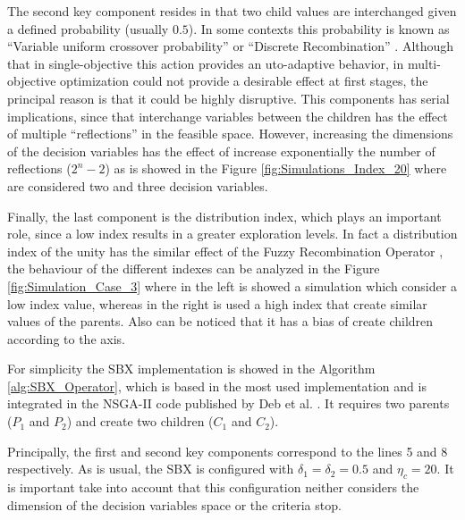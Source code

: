 The second key component resides in that two child values are interchanged given a defined probability (usually $0.5$).
%
In some contexts this probability is known as ``Variable uniform crossover probability'' \cite{tuvsar2007differential} or ``Discrete Recombination'' \cite{muhlenbein1993predictive}.
%
Although that in single-objective this action provides an uto-adaptive behavior, in multi-objective optimization could not provide a desirable effect at first stages, the principal reason is that it could be highly disruptive.
%
This components has serial implications, since that interchange variables between the children has the effect of multiple ``reflections'' in the feasible space.
%
However, increasing the dimensions of the decision variables has the effect of increase exponentially the number of reflections ($2^{n}-2$) as is showed in the Figure \ref{fig:Simulations_Index_20} where are considered two and three decision variables.
%

Finally, the last component is the distribution index, which plays an important role, since a low index results in a greater exploration levels.
%
In fact a distribution index of the unity has the similar effect of the Fuzzy Recombination Operator \cite{voigt1995fuzzy}, the behaviour of the different indexes can be analyzed in the Figure \ref{fig:Simulation_Case_3} where in the left is showed a simulation which consider a low index value, whereas in the right is used a high index that create similar values of the parents.
%
Also can be noticed that it has a bias of create children according to the axis.
%

%
For simplicity the SBX implementation is showed in the Algorithm \ref{alg:SBX_Operator}, which is based in the most used implementation and is integrated in the NSGA-II code published by Deb et al. \cite{Joel:NSGAII}.
%
It requires two parents ($P_1$ and $P_2$) and create two children ($C_1$ and $C_2$).
%

Principally, the first and second key components correspond to the lines 5 and 8 respectively. 
%
As is usual, the SBX is configured with $\delta_1 = \delta_2 = 0.5$ and $\eta_c = 20$.
%
It is important take into account that this configuration neither considers the dimension of the decision variables space or the criteria stop.



